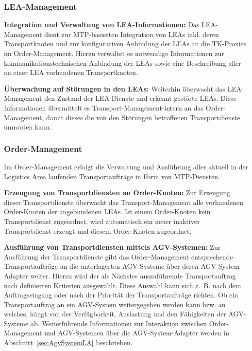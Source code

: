 \subsubsection{LEA-Management}

\textbf{Integration und Verwaltung von LEA-Informationen:} Das LEA-Management dient zur MTP-basierten Integration von LEAs inkl. deren Transportknoten und zur konfigurativen Anbindung der LEAs an die TK-Proxies im Order-Management. Hierzu verwaltet es notwendige Informationen zur kommunikationstechnischen Anbindung der LEAs sowie eine Beschreibung aller an einer LEA vorhandenen Transportknoten. 

\textbf{Überwachung auf Störungen in den LEAs:} Weiterhin überwacht das LEA-Management den Zustand der LEA-Dienste und erkennt gestörte LEAs. Diese Informationen übermittelt es Transport-Management-intern an das Order-Management, damit dieses die von den Störungen betroffenen Transportdienste umrouten kann.

\subsubsection{Order-Management}

Im Order-Management erfolgt die Verwaltung und Ausführung aller aktuell in der Logistics Area laufenden Transportaufträge in Form von MTP-Diensten. 

\textbf{Erzeugung von Transportdiensten an Order-Knoten:} Zur Erzeugung dieser Transportdienste überwacht das Transport-Management alle vorhandenen Order-Knoten der angebundenen LEAs. Ist einem Order-Knoten kein Transportdienst zugeordnet, wird automatisch ein neuer inaktiver Transportdienst erzeugt und diesem Order-Knoten zugeordnet. 

\textbf{Ausführung von Transportdiensten mittels AGV-Systemen:} Zur Ausführung der Transportdienste gibt das Order-Management entsprechende Transportaufträge an die unterlagerten AGV-Systeme über deren AGV-System-Adapter weiter. Hierzu wird der als Nächstes auszuführende Transportauftrag nach definierten Kriterien ausgewählt. Diese Auswahl kann sich z.~B. nach dem Auftragseingang oder nach der Priorität der Transportaufträge richten. Ob ein Transportauftrag an ein AGV-System weitergegeben werden kann bzw. an welches, hängt von der Verfügbarkeit, Auslastung und den Fähigkeiten der AGV-Systeme ab. Weiterführende Informationen zur Interaktion zwischen Order-Management und AGV-Systemen über die AGV-System-Adapter werden in Abschnitt~\ref{sec:AgvSystemLA} beschrieben.

